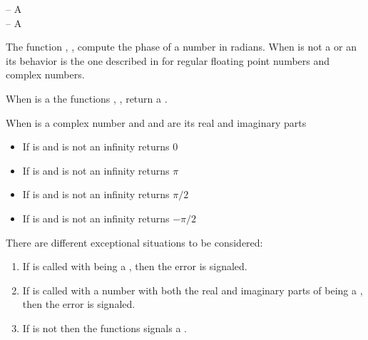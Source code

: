 \documentclass[../Exponentials-Logarithms-Trigonometry.tex]{subfiles}
\begin{document}

\DSyntax{}

  \RArrow {}

\DArgsNValues{}

 -- A \\
 -- A 

\DDescription{}

The function , ,  compute the phase of a 
number in radians. When  is not a  or an
 its behavior is the one described in
\cite{1996:ANSIHyperSpec} for regular floating point numbers and complex
numbers.

\noindent
When  is a  the functions ,
,  return a .

When  is a complex number and  and  are its
real and imaginary parts
\begin{itemize}
  \item If  is  and  is not an
  infinity  returns $0$
  \item If  is  and  is not an
  infinity  returns $\pi$
  \item If  is  and  is not an
  infinity  returns $\pi/2$
  \item If  is  and  is not an
  infinity  returns $-\pi/2$
\end{itemize}

\DExceptional{}

There are different exceptional situations to be considered:
\begin{enumerate}
  \item If  is called with
     being a , then the
     error is signaled.
  \item If  is called with a number with both the real and
  imaginary parts of  being a , then the
     error is signaled.
  \item If  is not \CL{}
     then the functions  signals a
  .
\end{enumerate}
\end{document}
